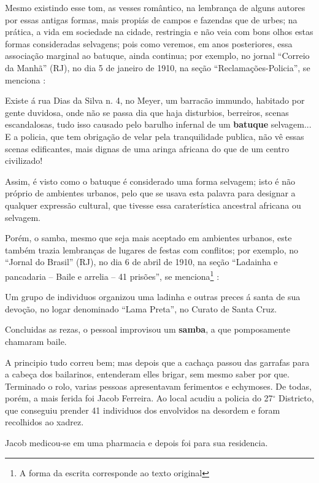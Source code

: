 Mesmo existindo esse tom, as vesses romântico, 
na lembrança de alguns autores por essas antigas formas,
mais propiás de campos e fazendas que de urbes;
na prática, a vida em sociedade na cidade, 
restringia e não veia com bons olhos estas formas consideradas selvagens;
pois como veremos, em anos posteriores, essa associação marginal ao batuque, ainda continua;
por exemplo, no jornal ``Correio da Manhã'' (RJ), 
no dia 5 de janeiro de 1910, na seção ``Reclamações-Policia'',
se menciona \cite[pp. 4]{batuqueperiodicocorreiomanha}:
\begin{citando}%
Existe á rua Dias da Silva n. 4, no 
Meyer, um barracão immundo, habitado por
gente duvidosa, onde não se passa dia que 
haja disturbios, berreiros, scenas 
escandalosas, tudo isso causado pelo barulho
infernal de um \textbf{batuque} selvagem... E a 
policia, que tem obrigação de velar pela 
tranquilidade publica, não vê essas scenas
edificantes, mais dignas de uma aringa 
africana do que de um centro civilizado!
\end{citando}
Assim, é visto como o batuque é considerado uma forma selvagem;
isto é não próprio de ambientes urbanos,
pelo que se usava esta palavra para designar a qualquer expressão cultural,
 que tivesse essa caraterística ancestral africana ou selvagem. 

Porém, o samba, mesmo que seja mais aceptado em ambientes urbanos,
este também trazia lembranças de lugares de festas com conflitos;
por exemplo, no ``Jornal do Brasil'' (RJ), 
no dia 6 de abril de 1910, na seção ``Ladainha e pancadaria -- Baile e arrelia -- 41 prisões'',
se menciona\footnote{\label{footort5}A forma da escrita corresponde ao texto original} \cite[pp. 12]{batuqueperiodicojornaldobrasil}:
\begin{citando}%
Um grupo de individuos organizou
uma ladinha e outras preces 
á santa de sua devoção, no logar 
denominado ``Lama Preta'', no 
Curato de Santa Cruz.

Concluidas as rezas, o pessoal 
improvisou um \textbf{samba}, a que 
pomposamente chamaram baile.

A principio tudo correu bem;
mas depois que a cachaça passou
das garrafas para a cabeça dos 
bailarinos, entenderam elles 
brigar, sem mesmo saber por que.
Terminado o rolo, varias 
pessoas apresentavam ferimentos e echymoses.
De todas, porém, a mais ferida foi Jacob Ferreira.
Ao local acudiu a policia do 27$^{\circ}$ 
Districto, que conseguiu prender 
41 individuos dos envolvidos na 
desordem e foram recolhidos ao xadrez.

Jacob medicou-se em uma pharmacia e depois foi para sua residencia.
\end{citando}


